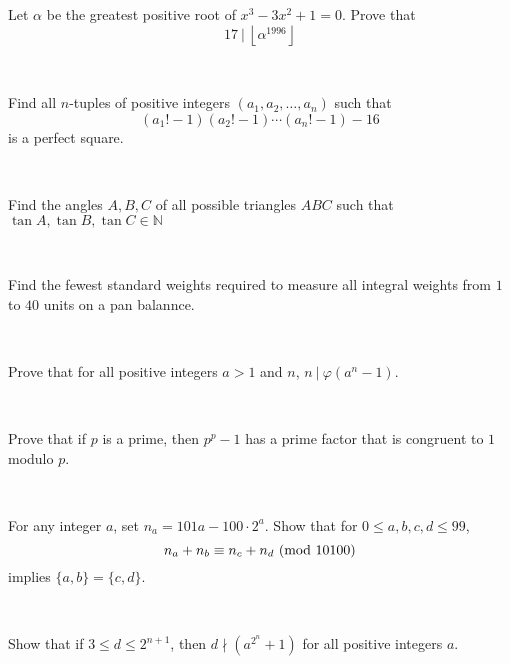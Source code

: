 \begin{problem}
\label{week1:p1}
    Let $\alpha$ be the greatest positive root of $x^3 - 3x^2 + 1 = 0$. Prove that \[ 17 \ | \ \left\lfloor \alpha^{1996} \right\rfloor \] 
\end{problem}

\ 

\begin{problem}
\label{week1:p2}
    Find all $n$-tuples of positive integers $(a_1, a_2, \dots, a_n)$ such that \[ (a_1!-1)(a_2!-1) \cdots (a_n!-1) - 16 \] is a perfect square. 
\end{problem}

\

\begin{problem}
\label{week1:p3}
    Find the angles $A,B,C$ of all possible triangles $ABC$ such that $\tan{A}, \tan{B}, \tan{C} \in \mathbb{N}$
\end{problem}


\ 

\begin{problem}
    \label{week1:p4}
    Find the fewest standard weights required to measure all integral weights from $1$ to $40$ units on a pan balannce.
\end{problem}

\ 

\begin{problem}
\label{week1:p5}
    Prove that for all positive integers $a > 1$ and $n$, $n \ | \ \varphi(a^n-1)$.
\end{problem}

\ 

\begin{problem}
\label{week1:p6}
    Prove that if $p$ is a prime, then $p^p -1$ has a prime factor that is congruent to $1$ modulo $p$.
\end{problem}

\

\begin{problem} 
\label{week1:p7}
    For any integer $a$, set $n_a = 101a - 100 \cdot 2^a$. Show that for $ 0 \leq a,b,c,d \leq 99$, \[n_a + n_b \equiv n_c + n_d \ (\mbox{mod } 10100)\] implies $\{a,b\} = \{c,d\}$.
\end{problem}

\ 

\begin{problem} 
\label{week1:p8}
    Show that if $ 3 \leq d \leq 2^{n+1}$, then $d \nmid \left( a^{2^n} + 1 \right)$ for all positive integers $a$.
\end{problem}


